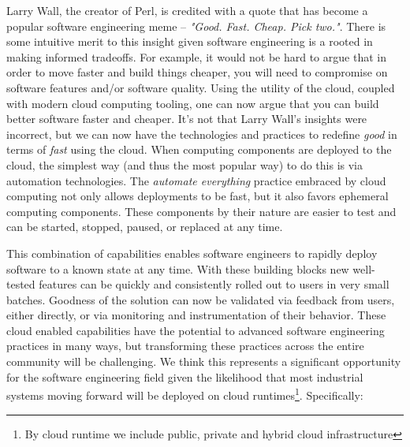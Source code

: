\documentclass[conference]{IEEEconf}
\begin{document}
Larry Wall, the creator of Perl, is credited with a quote that has become a popular software engineering meme -- \textit{"Good. Fast. Cheap. Pick two."}.  There is some intuitive merit to this insight given software engineering is a rooted in making informed tradeoffs.  For example, it would not be hard to argue that in order to move faster and build things cheaper, you will need to compromise on software features and/or software quality. Using the utility of the cloud, coupled with modern cloud computing tooling, one can now argue that you can build better software faster and cheaper.  It's not that Larry Wall's insights were incorrect, but we can now have the technologies and practices to redefine \textit{good} in terms of \textit{fast} using the cloud.  When computing components are deployed to the cloud, the simplest way (and thus the most popular way) to do this is via automation technologies\cite{terraform, AWSCloudFormation, AzureLaunch, Pulumi}.  The \textit{automate everything} practice embraced by cloud computing not only allows deployments to be fast, but it also favors ephemeral computing components. These components by their nature are easier to test\cite{kim2016devops} and can be started, stopped, paused, or replaced at any time. 

This combination of capabilities enables software engineers to rapidly deploy software to a known state at any time. With these building blocks new well-tested features can be quickly and consistently rolled out to users in very small batches.  Goodness of the solution can now be validated via feedback from users, either directly, or via monitoring and instrumentation of their behavior.  These cloud enabled capabilities have the potential to advanced software engineering practices in many ways, but transforming these practices across the entire community will be challenging. We think this represents a significant opportunity for the software engineering field given the likelihood that most industrial systems moving forward will be deployed on cloud runtimes\footnote{By cloud runtime we include public, private and hybrid cloud infrastructure}. Specifically:
\end{document}
